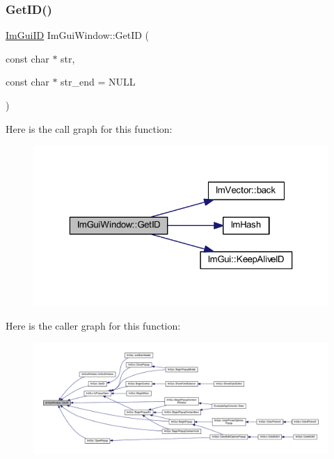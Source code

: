 \subsubsection{\texorpdfstring{Get\+I\+D()}{GetID()}\hspace{0.1cm}{\footnotesize\ttfamily [1/2]}}
{\footnotesize\ttfamily \mbox{\hyperlink{imgui_8h_a1785c9b6f4e16406764a85f32582236f}{Im\+Gui\+ID}} Im\+Gui\+Window\+::\+Get\+ID (\begin{DoxyParamCaption}\item[{const char $\ast$}]{str,  }\item[{const char $\ast$}]{str\+\_\+end = {\ttfamily NULL} }\end{DoxyParamCaption})}

Here is the call graph for this function\+:
\nopagebreak
\begin{figure}[H]
\begin{center}
\leavevmode
\includegraphics[width=323pt]{struct_im_gui_window_a66400a63bc0b54d7d29e08d1b1b1a42b_cgraph}
\end{center}
\end{figure}
Here is the caller graph for this function\+:
\nopagebreak
\begin{figure}[H]
\begin{center}
\leavevmode
\includegraphics[width=350pt]{struct_im_gui_window_a66400a63bc0b54d7d29e08d1b1b1a42b_icgraph}
\end{center}
\end{figure}
\mbox{\label{struct_im_gui_window_aae21dffb343cabca9414499b827912a8}} 
